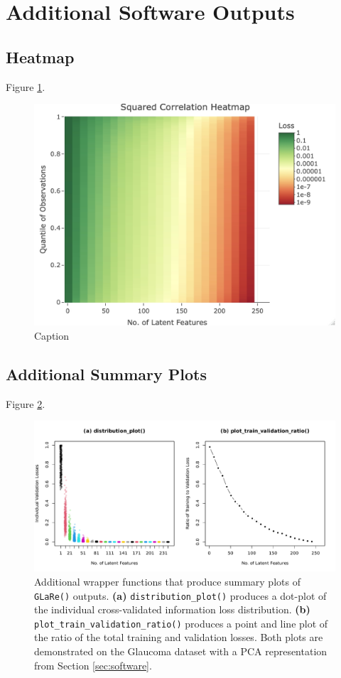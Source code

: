\section{Additional Software Outputs}\label{sec:additional-outputs}


\subsection{Heatmap}

Figure \ref{fig:eye-heatmap}.

\begin{figure}
    \centering
    \includegraphics[width=0.75\linewidth]{figures/eye-heatmap.jpeg}
    \caption{Caption}
    \label{fig:eye-heatmap}
\end{figure}

\subsection{Additional Summary Plots}

Figure \ref{fig:additional-plots-01}.

\begin{figure}
    \centering
    \includegraphics[width=1\linewidth]{figures/additional-plots-01.pdf}
    \caption{Additional wrapper functions that produce summary plots of \texttt{GLaRe()} outputs. \textbf{(a)} \texttt{distribution\_plot()} produces a dot-plot of the individual cross-validated information loss distribution. \textbf{(b)} \texttt{plot\_train\_validation\_ratio()} produces a point and line plot of the ratio of the total training and validation losses.
    Both plots are demonstrated on the Glaucoma dataset with a PCA representation from Section \ref{sec:software}.}
    \label{fig:additional-plots-01}
\end{figure}

